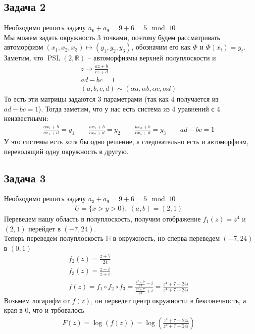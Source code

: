 \subsection*{Задача 2}
	Необходимо решить задачу $a_6 + a_9 = 9 + 6 = 5 \mod 10$\\
	Мы можем задать окружность 3 точками, поэтому будем рассматривать автоморфизм $(x_1, x_2, x_3) \mapsto (y_1, y_2, y_3)$, обозначим его как $\Phi$ и $\Phi(x_i) = y_i$. Заметим, что $\operatorname{PSL}(2, \mathbb{R})$ -- автоморфизмы верхней полуплоскости и
	\begin{gather*}
		z \to \frac{az + b}{cz + d}\\
		ad - bc = 1\\
		(a,b,c,d) \sim (\alpha a, \alpha b,\alpha c,\alpha d)
	\end{gather*}
	То есть эти матрицы задаются 3 параметрами (так как 4 получается из $ad - bc = 1$). Тогда заметим, что у нас есть система из 4 уравнений с 4 неизвестными:
	\begin{gather*}
		\frac{ax_1 + b}{cx_1 + d} = y_1\qquad
		\frac{ax_2 + b}{cx_2 + d} = y_2\qquad
		\frac{ax_3 + b}{cx_3 + d} = y_3\qquad
		ad-bc = 1
	\end{gather*}
	У это системы есть хотя бы одно решение, а следовательно есть и автоморфизм, переводящий одну окружность в другую.
	\begin{comment}
	Заметим, что можно построить биекцию из любого круга в любую полуплоскость, для определенности, $\mathbb{H} = \{\Im(z) > 0\}$, тогда если есть 2 круга $O_1, O_2$, то можно построить две биекции $f_1: O_1 \to \mathbb{H},\ f_2: \mathbb{H} \to O_2$ и $f_1 \circ f_2$ будет биекцией $O_1 \to O_2$, при это граница биективно отобразилась в границу, что и требовалось. 
	\end{comment}
\vskip 0.4in

\subsection*{Задача 3}
	Необходимо решить задачу $a_3 + a_9 = 9 + 6 = 5 \mod 10$
	\begin{gather*}
		U = \{x > y > 0\},\ (a,b) = (2, 1)
	\end{gather*}
	Переведем нашу область в полуплоскость, получим отображение
	$f_1(z) = z^4$ и $(2,1)$ перейдет в $(-7, 24)$.\\
	Теперь переведем полуплоскость $\mathbb{H}$ в окружность, но сперва переведем $(-7,24)$ в $(0,1)$
	\begin{gather*}
		f_2(z) = \frac{z+7}{24}\\
		f_3(z) = \frac{z-i}{z+i}\\
		f(z) = f_1 \circ f_2 \circ f_3
		= \frac{\frac{z^4+7}{24} - i}{\frac{z^4+7}{24} + i}
		= \frac{z^4 + 7 - 24i}{z^4 + 7 - 24i} 
	\end{gather*}
	Возьмем логарифм от $f(z)$, он перведет центр окружности в бексонечность, а края в 0, что и трбовалось
	\begin{gather*}
		F(z) = \log(f(z))
		= \log\left( \frac{z^4 + 7 - 24i}{z^4 + 7 - 24i} \right)
	\end{gather*}

